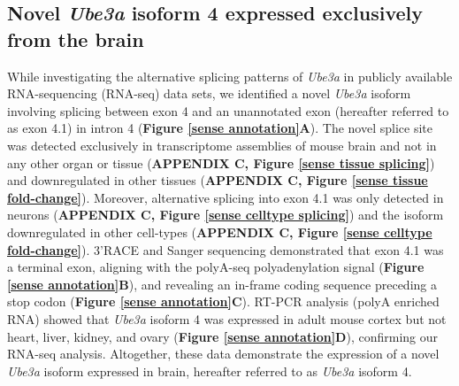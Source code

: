 \subsection{Novel \textit{Ube3a} isoform 4 expressed exclusively from the brain}
While investigating the alternative splicing patterns of \textit{Ube3a} in publicly available RNA-sequencing (RNA-seq) data sets, we identified a novel \textit{Ube3a} isoform involving splicing between exon 4 and an unannotated exon (hereafter referred to as exon 4.1) in intron 4 (\textbf{Figure \ref{sense annotation}A}).  The novel splice site was detected exclusively in transcriptome assemblies of mouse brain and not in any other organ or tissue (\textbf{APPENDIX C, Figure \ref{sense tissue splicing}}) and downregulated in other tissues (\textbf{APPENDIX C, Figure \ref{sense tissue fold-change}}). Moreover, alternative splicing into exon 4.1 was only detected in neurons (\textbf{APPENDIX C, Figure \ref{sense celltype splicing}}) and the isoform downregulated in other cell-types (\textbf{APPENDIX C, Figure \ref{sense celltype fold-change}}). 3'RACE and Sanger sequencing demonstrated that exon 4.1 was a terminal exon, aligning with the polyA-seq polyadenylation signal (\textbf{Figure \ref{sense annotation}B}), and revealing an in-frame coding sequence preceding a stop codon (\textbf{Figure \ref{sense annotation}C}). RT-PCR analysis (polyA enriched RNA) showed that \textit{Ube3a} isoform 4 was expressed in adult mouse cortex but not heart, liver, kidney, and ovary (\textbf{Figure \ref{sense annotation}D}), confirming our RNA-seq analysis.  Altogether, these data demonstrate the expression of a novel \textit{Ube3a} isoform expressed in brain, hereafter referred to as \textit{Ube3a} isoform 4.

